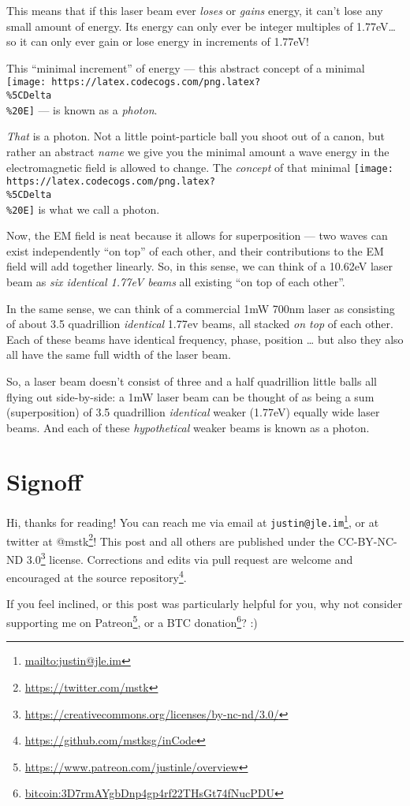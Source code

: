 \documentclass[]{article}
\renewcommand{\href}[2]{#2\footnote{\url{#1}}}
\begin{document}
This means that if this laser beam ever \emph{loses} or \emph{gains} energy, it
can't lose any small amount of energy. Its energy can only ever be integer
multiples of 1.77eV\ldots so it can only ever gain or lose energy in increments
of 1.77eV!

This ``minimal increment'' of energy --- this abstract concept of a minimal
\texttt{[image: https://latex.codecogs.com/png.latex?\\\%5CDelta\\\%20E]} --- is
known as a \emph{photon}.

\emph{That} is a photon. Not a little point-particle ball you shoot out of a
canon, but rather an abstract \emph{name} we give you the minimal amount a wave
energy in the electromagnetic field is allowed to change. The \emph{concept} of
that minimal
\texttt{[image: https://latex.codecogs.com/png.latex?\\\%5CDelta\\\%20E]} is what we
call a photon.

Now, the EM field is neat because it allows for superposition --- two waves can
exist independently ``on top'' of each other, and their contributions to the EM
field will add together linearly. So, in this sense, we can think of a 10.62eV
laser beam as \emph{six identical 1.77eV beams} all existing ``on top of each
other''.

In the same sense, we can think of a commercial 1mW 700nm laser as consisting of
about 3.5 quadrillion \emph{identical} 1.77ev beams, all stacked \emph{on top}
of each other. Each of these beams have identical frequency, phase, position
\ldots{} but also they also all have the same full width of the laser beam.

So, a laser beam doesn't consist of three and a half quadrillion little balls
all flying out side-by-side: a 1mW laser beam can be thought of as being a sum
(superposition) of 3.5 quadrillion \emph{identical} weaker (1.77eV) equally wide
laser beams. And each of these \emph{hypothetical} weaker beams is known as a
photon.

\hypertarget{signoff}{%
\section{Signoff}\label{signoff}}

Hi, thanks for reading! You can reach me via email at
\href{mailto:justin@jle.im}{\nolinkurl{justin@jle.im}}, or at twitter at
\href{https://twitter.com/mstk}{@mstk}! This post and all others are published
under the \href{https://creativecommons.org/licenses/by-nc-nd/3.0/}{CC-BY-NC-ND
3.0} license. Corrections and edits via pull request are welcome and encouraged
at \href{https://github.com/mstksg/inCode}{the source repository}.

If you feel inclined, or this post was particularly helpful for you, why not
consider \href{https://www.patreon.com/justinle/overview}{supporting me on
Patreon}, or a \href{bitcoin:3D7rmAYgbDnp4gp4rf22THsGt74fNucPDU}{BTC donation}?
:)
\end{document}
